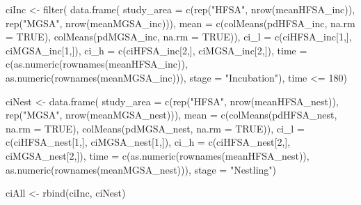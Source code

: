 \documentclass[
]{article}
\newenvironment{Shaded}{\begin{snugshade}}{\end{snugshade}}
\newcommand{\AttributeTok}[1]{\textcolor[rgb]{0.77,0.63,0.00}{#1}}
\newcommand{\ConstantTok}[1]{\textcolor[rgb]{0.00,0.00,0.00}{#1}}
\newcommand{\DecValTok}[1]{\textcolor[rgb]{0.00,0.00,0.81}{#1}}
\newcommand{\FunctionTok}[1]{\textcolor[rgb]{0.00,0.00,0.00}{#1}}
\newcommand{\NormalTok}[1]{#1}
\newcommand{\OtherTok}[1]{\textcolor[rgb]{0.56,0.35,0.01}{#1}}
\newcommand{\SpecialCharTok}[1]{\textcolor[rgb]{0.00,0.00,0.00}{#1}}
\newcommand{\StringTok}[1]{\textcolor[rgb]{0.31,0.60,0.02}{#1}}
\begin{document}
\begin{Shaded}
\begin{Highlighting}[]
\NormalTok{ciInc }\OtherTok{\textless{}{-}} \FunctionTok{filter}\NormalTok{(}
  \FunctionTok{data.frame}\NormalTok{(}
    \AttributeTok{study\_area =} \FunctionTok{c}\NormalTok{(}\FunctionTok{rep}\NormalTok{(}\StringTok{"HFSA"}\NormalTok{, }\FunctionTok{nrow}\NormalTok{(meanHFSA\_inc)), }\FunctionTok{rep}\NormalTok{(}\StringTok{"MGSA"}\NormalTok{, }\FunctionTok{nrow}\NormalTok{(meanMGSA\_inc))),}
    \AttributeTok{mean =} \FunctionTok{c}\NormalTok{(}\FunctionTok{colMeans}\NormalTok{(pdHFSA\_inc, }\AttributeTok{na.rm =} \ConstantTok{TRUE}\NormalTok{), }\FunctionTok{colMeans}\NormalTok{(pdMGSA\_inc, }\AttributeTok{na.rm =} \ConstantTok{TRUE}\NormalTok{)),}
    \AttributeTok{ci\_l =} \FunctionTok{c}\NormalTok{(ciHFSA\_inc[}\DecValTok{1}\NormalTok{,], ciMGSA\_inc[}\DecValTok{1}\NormalTok{,]),}
    \AttributeTok{ci\_h =} \FunctionTok{c}\NormalTok{(ciHFSA\_inc[}\DecValTok{2}\NormalTok{,], ciMGSA\_inc[}\DecValTok{2}\NormalTok{,]),}
    \AttributeTok{time =} \FunctionTok{c}\NormalTok{(}\FunctionTok{as.numeric}\NormalTok{(}\FunctionTok{rownames}\NormalTok{(meanHFSA\_inc)), }\FunctionTok{as.numeric}\NormalTok{(}\FunctionTok{rownames}\NormalTok{(meanMGSA\_inc))),}
    \AttributeTok{stage =} \StringTok{"Incubation"}\NormalTok{),}
\NormalTok{  time }\SpecialCharTok{\textless{}=} \DecValTok{180}\NormalTok{)}


\NormalTok{ciNest }\OtherTok{\textless{}{-}} \FunctionTok{data.frame}\NormalTok{(}
    \AttributeTok{study\_area =} \FunctionTok{c}\NormalTok{(}\FunctionTok{rep}\NormalTok{(}\StringTok{"HFSA"}\NormalTok{, }\FunctionTok{nrow}\NormalTok{(meanHFSA\_nest)), }\FunctionTok{rep}\NormalTok{(}\StringTok{"MGSA"}\NormalTok{, }\FunctionTok{nrow}\NormalTok{(meanMGSA\_nest))),}
    \AttributeTok{mean =} \FunctionTok{c}\NormalTok{(}\FunctionTok{colMeans}\NormalTok{(pdHFSA\_nest, }\AttributeTok{na.rm =} \ConstantTok{TRUE}\NormalTok{), }\FunctionTok{colMeans}\NormalTok{(pdMGSA\_nest, }\AttributeTok{na.rm =} \ConstantTok{TRUE}\NormalTok{)),}
    \AttributeTok{ci\_l =} \FunctionTok{c}\NormalTok{(ciHFSA\_nest[}\DecValTok{1}\NormalTok{,], ciMGSA\_nest[}\DecValTok{1}\NormalTok{,]),}
    \AttributeTok{ci\_h =} \FunctionTok{c}\NormalTok{(ciHFSA\_nest[}\DecValTok{2}\NormalTok{,], ciMGSA\_nest[}\DecValTok{2}\NormalTok{,]),}
    \AttributeTok{time =} \FunctionTok{c}\NormalTok{(}\FunctionTok{as.numeric}\NormalTok{(}\FunctionTok{rownames}\NormalTok{(meanHFSA\_nest)), }\FunctionTok{as.numeric}\NormalTok{(}\FunctionTok{rownames}\NormalTok{(meanMGSA\_nest))),}
    \AttributeTok{stage =} \StringTok{"Nestling"}\NormalTok{)}
    
\NormalTok{ciAll }\OtherTok{\textless{}{-}} \FunctionTok{rbind}\NormalTok{(ciInc, ciNest)}
\end{Highlighting}
\end{Shaded}
\end{document}
